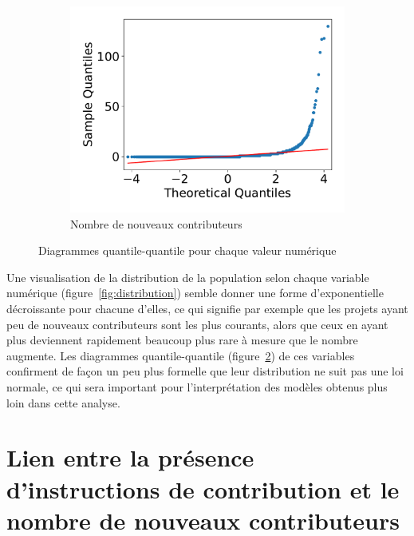 \begin{figure}[ht]
\begin{subfigure}[t]{0.3\textwidth}
        \includegraphics[width=\textwidth]{experiment/data_analysis/newContributorCount_qqplot}
        \caption{Nombre de nouveaux contributeurs}
        \label{sfig:newContributorQQplot}
    \end{subfigure}

    \caption{Diagrammes quantile-quantile pour chaque valeur numérique}
    \label{fig:qqplots}
\end{figure}

Une visualisation de la distribution de la population selon chaque variable numérique
(figure~\ref{fig:distribution}) semble donner une forme d'exponentielle décroissante pour chacune d'elles, ce
qui signifie par exemple que les projets ayant peu de nouveaux contributeurs sont les plus courants, alors que
ceux en ayant plus deviennent rapidement beaucoup plus rare à mesure que le nombre augmente. Les diagrammes
quantile-quantile (figure~\ref{fig:qqplots}) de ces variables confirment de façon un peu plus formelle que
leur distribution ne suit pas une loi normale, ce qui sera important pour l'interprétation des modèles obtenus
plus loin dans cette analyse.

\section{Lien entre la présence d'instructions de contribution et le nombre de nouveaux contributeurs}

